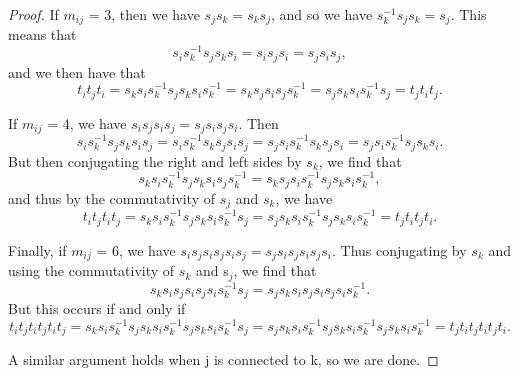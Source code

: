 \documentclass[11pt]{amsart}
\theoremstyle{definition}
\begin{document}
\begin{proof}
If $m_{ij}$ = 3, then we have $s_{j}s_{k} = s_{k}s_{j}$, and so we have $s_{k}^{-1}s_{j}s_{k} = s_{j}.$ This means that $$s_{i}s_{k}^{-1}s_{j}s_{k}s_{i} = s_{i}s_{j}s_{i} = s_{j}s_{i}s_{j},$$ and we then have that $$t_{i}t_{j}t_{i} = s_{k}s_{i}s_{k}^{-1}s_{j}s_{k}s_{i}s_{k}^{-1} = s_{k}s_{j}s_{i}s_{j}s_{k}^{-1} = s_{j}s_{k}s_{i}s_{k}^{-1}s_{j} = t_{j}t_{i}t_{j}.$$

If $m_{ij}$ = 4, we have $s_{i}s_{j}s_{i}s_{j} = s_{j}s_{i}s_{j}s_{i}$. Then $$s_{i}s_{k}^{-1}s_{j}s_{k}s_{i}s_{j} = s_{i}s_{k}^{-1}s_{k}s_{j}s_{i}s_{j} = s_{j}s_{i}s_{k}^{-1}s_{k}s_{j}s_{i} = s_{j}s_{i}s_{k}^{-1}s_{j}s_{k}s_{i}.$$ But then conjugating the right and left sides by $s_{k}$, we find that $$s_{k}s_{i}s_{k}^{-1}s_{j}s_{k}s_{i}s_{j}s_{k}^{-1} = s_{k}s_{j}s_{i}s_{k}^{-1}s_{j}s_{k}s_{i}s_{k}^{-1},$$ and thus by the commutativity of $s_{j}$ and $s_{k}$, we have $$t_{i}t_{j}t_{i}t_{j} = s_{k}s_{i}s_{k}^{-1}s_{j}s_{k}s_{i}s_{k}^{-1}s_{j} = s_{j}s_{k}s_{i}s_{k}^{-1}s_{j}s_{k}s_{i}s_{k}^{-1} = t_{j}t_{i}t_{j}t_{i}.$$

Finally, if $m_{ij}$ = 6, we have $s_{i}s_{j}s_{i}s_{j}s_{i}s_{j} = s_{j}s_{i}s_{j}s_{i}s_{j}s_{i}$. Thus conjugating by $s_{k}$ and using the commutativity of  $s_{k}$ and s$_{j}$, we find that $$s_{k}s_{i}s_{j}s_{i}s_{j}s_{i}s_{k}^{-1}s_{j} = s_{j}s_{k}s_{i}s_{j}s_{i}s_{j}s_{i}s_{k}^{-1}.$$ But this occurs if and only if $$t_{i}t_{j}t_{i}t_{j}t_{i}t_{j} = s_{k}s_{i}s_{k}^{-1}s_{j}s_{k}s_{i}s_{k}^{-1}s_{j}s_{k}s_{i}s_{k}^{-1}s_{j} = s_{j}s_{k}s_{i}s_{k}^{-1}s_{j}s_{k}s_{i}s_{k}^{-1}s_{j}s_{k}s_{i}s_{k}^{-1} = t_{j}t_{i}t_{j}t_{i}t_{j}t_{i}.$$ 

A similar argument holds when j is connected to k, so we are done.
\end{proof} 
\end{document}
